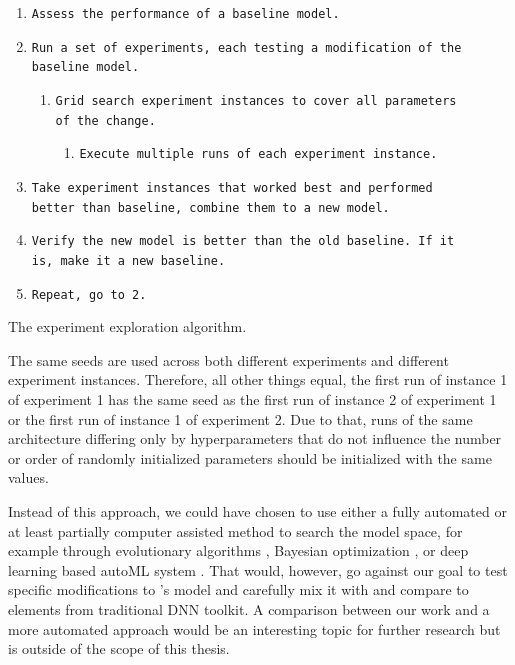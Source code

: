 \begin{enumerate}[noitemsep]
    \item \texttt{Assess the performance of a baseline model.}
    \item \texttt{Run a set of experiments, each testing a modification of the\\ baseline model.}
    \begin{enumerate}[nosep]
        \item \texttt{Grid search experiment instances to cover all parameters\\ of the change.}
        \begin{enumerate}[nosep]
            \item \texttt{Execute multiple runs of each experiment instance.}
        \end{enumerate}
    \end{enumerate}
    \item \texttt{Take experiment instances that worked best and performed\\ better than baseline, combine them to a new model.}
    \item \texttt{Verify the new model is better than the old baseline. If it\\ is, make it a new baseline.}
    \item \texttt{Repeat, go to 2.}
\end{enumerate}
\begin{center}
    {The experiment exploration algorithm.}
\end{center}

The same seeds are used across both different experiments and different experiment instances. Therefore, all other things equal, the first run of instance 1 of experiment 1 has the same seed as the first run of instance 2 of experiment 1 or the first run of instance 1 of experiment 2. Due to that, runs of the same architecture differing only by hyperparameters that do not influence the number or order of randomly initialized parameters should be initialized with the same values.

Instead of this approach, we could have chosen to use either a fully automated or at least partially computer assisted method to search the model space, for example through evolutionary algorithms \citep{2017arXiv170300548M}, Bayesian optimization \citep{thesis_arnold}, or deep learning based autoML system \citep{2016arXiv161101578Z}. That would, however, go against our goal to test specific modifications to \citeauthor{antolik}’s model and carefully mix it with and compare to elements from traditional DNN toolkit. A comparison between our work and a more automated approach would be an interesting topic for further research but is outside of the scope of this thesis.

